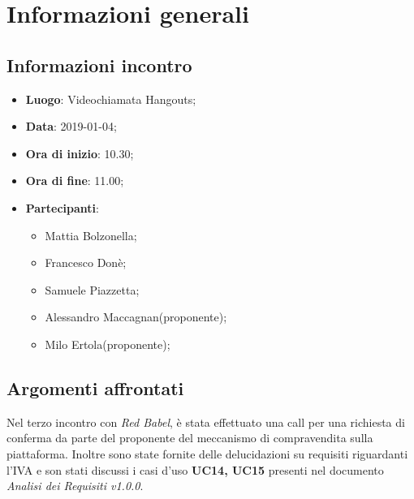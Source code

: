 \section{Informazioni generali}

\subsection{Informazioni incontro}
\begin{itemize}
\item \textbf{Luogo}: Videochiamata Hangouts;
\item \textbf{Data}: 2019-01-04;
\item \textbf{Ora di inizio}: 10.30;
\item \textbf{Ora di fine}: 11.00;
\item \textbf{Partecipanti}:
\begin{itemize}
	\item Mattia Bolzonella;
	\item Francesco Donè;
	\item Samuele Piazzetta;
	\item Alessandro Maccagnan(proponente);
	\item Milo Ertola(proponente);
\end{itemize}
\end{itemize}

\subsection{Argomenti affrontati}
Nel terzo incontro con \textit{Red Babel}, è stata effettuato una call per una 
richiesta di conferma da parte del proponente del meccanismo di compravendita 
sulla piattaforma. Inoltre sono state fornite delle delucidazioni su requisiti 
riguardanti l’IVA e son stati discussi i casi d’uso \textbf{UC14, UC15} presenti
nel documento \textit{Analisi dei Requisiti v1.0.0}.

